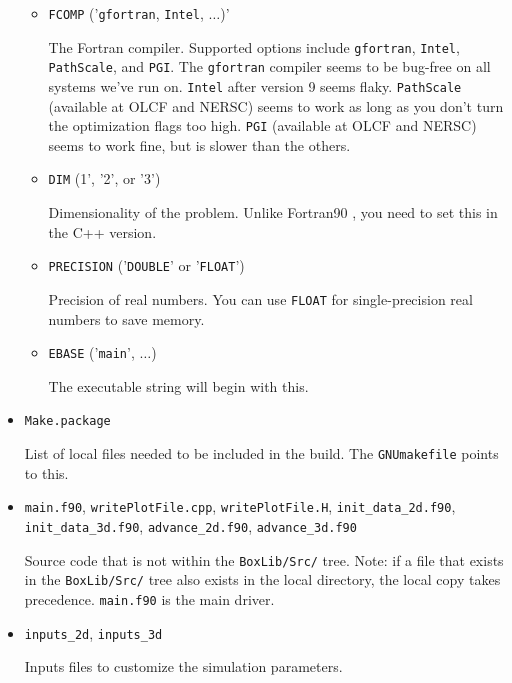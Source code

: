 \begin{itemize}
\begin{itemize}
    \item {\tt FCOMP} ('{\tt gfortran}, {\tt Intel}, $\ldots$)'

    The Fortran compiler.  Supported options include {\tt gfortran}, {\tt Intel}, {\tt PathScale}, and 
    {\tt PGI}.  The {\tt gfortran} compiler seems to 
    be bug-free on all systems we've run on.  {\tt Intel} after version 9 seems flaky.  {\tt PathScale} 
    (available at OLCF and NERSC) seems to work as long as you don't turn the optimization flags too high.
    {\tt PGI} (available at OLCF and NERSC) seems to work fine, but is slower than the others.

    \item {\tt DIM} (1', '2', or '3')

    Dimensionality of the problem.  Unlike Fortran90 \BoxLib, you need to set this in the C++ version.

    \item {\tt PRECISION} ('{\tt DOUBLE}' or '{\tt FLOAT}')

    Precision of real numbers.  You can use {\tt FLOAT} for single-precision real numbers to save memory.

    \item {\tt EBASE} ('{\tt main}', $\ldots$)

    The executable string will begin with this.

  \end{itemize}

\item {\tt Make.package}

List of local files needed to be included in the build.  The {\tt GNUmakefile} points to this.

\item {\tt main.f90}, {\tt writePlotFile.cpp}, {\tt writePlotFile.H}, {\tt init\_data\_2d.f90},
      {\tt init\_data\_3d.f90}, {\tt advance\_2d.f90}, {\tt advance\_3d.f90}

Source code that is not within the {\tt BoxLib/Src/} tree.  Note: if a file that exists in the
{\tt BoxLib/Src/} tree also exists in the local directory, the local copy takes precedence.
{\tt main.f90} is the main driver.

\item {\tt inputs\_2d}, {\tt inputs\_3d}

Inputs files to customize the simulation parameters.

\end{itemize}


